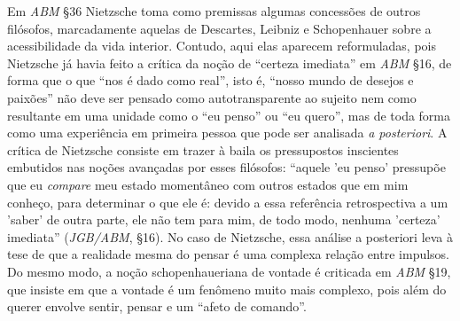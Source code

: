 \documentclass[
	12pt,				%
	openright,			%
	oneside,			%
	a4paper,			%
	english,			%
	french,				%
	spanish,			%
	brazil				%
	]{abntex2}
\begin{document}
	Em \textit{ABM} §36 Nietzsche toma como premissas algumas concessões de outros filósofos, marcadamente aquelas de Descartes, Leibniz e Schopenhauer sobre a acessibilidade da vida interior. Contudo, aqui elas aparecem reformuladas, pois Nietzsche já havia feito a crítica da noção de “certeza imediata” em \textit{ABM} §16, de forma que o que “nos é dado como real”, isto é, “nosso mundo de desejos e paixões” não deve ser pensado como autotransparente ao sujeito nem como resultante em uma unidade como o “eu penso” ou “eu quero”, mas de toda forma como uma experiência em primeira pessoa que pode ser analisada \textit{a posteriori}. A crítica de Nietzsche consiste em trazer à baila os pressupostos inscientes embutidos nas noções avançadas por esses filósofos: “aquele 'eu penso' pressupõe que eu \textit{compare} meu estado momentâneo com outros estados que em mim conheço, para determinar o que ele é: devido a essa referência retrospectiva a um 'saber' de outra parte, ele não tem para mim, de todo modo, nenhuma 'certeza' imediata” (\textit{JGB/ABM}, §16). No caso de Nietzsche, essa análise a posteriori leva à tese de que a realidade mesma do pensar é uma complexa relação entre impulsos. Do mesmo modo, a noção schopenhaueriana de vontade é criticada em \textit{ABM} §19, que insiste em que a vontade é um fenômeno muito mais complexo, pois além do querer envolve sentir, pensar e um “afeto de comando”. 
\end{document}
